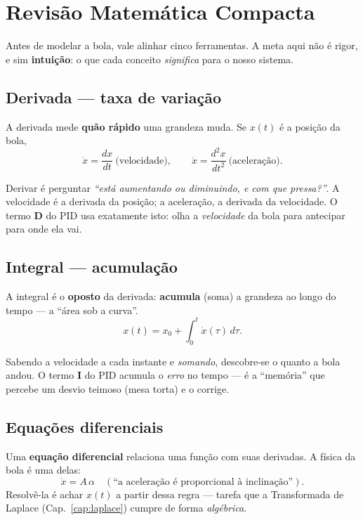\chapter{Revis\~ao Matem\'atica Compacta}\label{cap:matrev}

Antes de modelar a bola, vale alinhar cinco ferramentas. A meta aqui n\~ao \'e
rigor, e sim \textbf{intui\c{c}\~ao}: o que cada conceito \emph{significa} para o
nosso sistema.

\section{Derivada --- taxa de varia\c{c}\~ao}
A derivada mede \textbf{qu\~ao r\'apido} uma grandeza muda. Se $x(t)$ \'e a
posi\c{c}\~ao da bola,
\[
\dot x = \frac{dx}{dt}\ \text{(velocidade)},\qquad
\ddot x = \frac{d^2x}{dt^2}\ \text{(acelera\c{c}\~ao)}.
\]
\begin{intuicao}
Derivar \'e perguntar \emph{``est\'a aumentando ou diminuindo, e com que pressa?''}.
A velocidade \'e a derivada da posi\c{c}\~ao; a acelera\c{c}\~ao, a derivada da
velocidade. O termo \textbf{D} do PID usa exatamente isto: olha a \emph{velocidade}
da bola para antecipar para onde ela vai.
\end{intuicao}

\section{Integral --- acumula\c{c}\~ao}
A integral \'e o \textbf{oposto} da derivada: \textbf{acumula} (soma) a grandeza ao
longo do tempo --- a ``\'area sob a curva''.
\[
x(t) = x_0 + \int_0^t \dot x(\tau)\,d\tau.
\]
\begin{intuicao}
Sabendo a velocidade a cada instante e \emph{somando}, descobre-se o quanto a bola
andou. O termo \textbf{I} do PID acumula o \emph{erro} no tempo --- \'e a
``mem\'oria'' que percebe um desvio teimoso (mesa torta) e o corrige.
\end{intuicao}

\section{Equa\c{c}\~oes diferenciais}
Uma \textbf{equa\c{c}\~ao diferencial} relaciona uma fun\c{c}\~ao com suas
derivadas. A f\'isica da bola \'e uma delas:
\[
\ddot x = A\,\alpha \quad(\text{``a acelera\c{c}\~ao \'e proporcional \`a inclina\c{c}\~ao''}).
\]
Resolv\^e-la \'e achar $x(t)$ a partir dessa regra --- tarefa que a Transformada de
Laplace (Cap.~\ref{cap:laplace}) cumpre de forma \emph{alg\'ebrica}.

